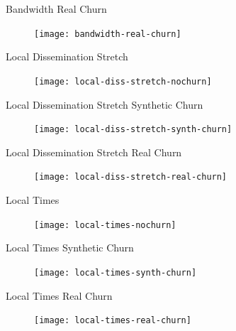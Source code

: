 \begin{frame}{Bandwidth Real Churn}
	\begin{figure}
		\texttt{[image: bandwidth-real-churn]}
	\end{figure}
\end{frame}

\begin{frame}{Local Dissemination Stretch}
	\begin{figure}
		\texttt{[image: local-diss-stretch-nochurn]}
	\end{figure}
\end{frame}

\begin{frame}{Local Dissemination Stretch Synthetic Churn}
	\begin{figure}
		\texttt{[image: local-diss-stretch-synth-churn]}
	\end{figure}
\end{frame}

\begin{frame}{Local Dissemination Stretch Real Churn}
	\begin{figure}
		\texttt{[image: local-diss-stretch-real-churn]}
	\end{figure}
\end{frame}

\begin{frame}{Local Times}
	\begin{figure}
		\texttt{[image: local-times-nochurn]}
	\end{figure}
\end{frame}

\begin{frame}{Local Times Synthetic Churn}
	\begin{figure}
		\texttt{[image: local-times-synth-churn]}
	\end{figure}
\end{frame}

\begin{frame}{Local Times Real Churn}
	\begin{figure}
		\texttt{[image: local-times-real-churn]}
	\end{figure}
\end{frame}

